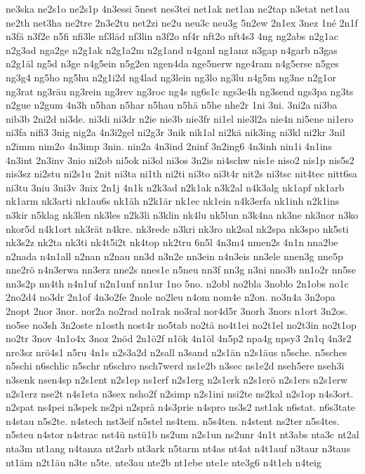 {ne3ska
ne2s1o
ne2s1p
4n3essi
5nest
nes3tei
net1ak
net1an
ne2tap
n3etat
net1au
ne2th
net3ha
ne2tre
2n3e2tu
net2zi
ne2u
neu3c
neu3g
5n2ew
2n1ex
3nez
1né
2n1f
n3fä
n3f2e
n5fi
nfi3le
nf3läd
nf3lin
n3f2o
nf4r
nft2o
nft4s3
4ng
ng2abs
n2g1ac
n2g3ad
nga2ge
n2g1ak
n2g1a2m
n2g1and
n4ganl
ng1anz
n3gap
n4garb
n3gas
n2g1äl
ng5d
n3ge
n4g5ein
n5g2en
ngen4da
nge5nerw
nge4ram
n4g5erse
n5ges
ng3g4
ng5ho
ng5hu
n2g1i2d
ng4lad
ng3lein
ng3lo
ng3lu
n4g5m
ng3ne
n2g1or
ng3rat
ng3räu
ng3rein
ng3rev
ng3roc
ng4s
ng6s1c
ngs3e4h
ng3send
ngs3pa
ng3ts
n2gue
n2gum
4n3h
n5han
n5har
n5hau
n5hä
n5he
nhe2r
1ni
3ni.
3ni2a
ni3ba
nib3b
2ni2d
ni3de.
ni3di
ni3dr
n2ie
nie3b
nie3fr
ni1el
nie3l2a
nie4n
ni5ene
ni1ero
ni3fa
nifi3
3nig
nig2a
4n3i2gel
ni2g3r
3nik
nik1al
ni2kä
nik3ing
ni3kl
ni2kr
3nil
n2imm
nim2o
4n3imp
3nin.
nin2a
4n3ind
2ninf
3n2ing6
4n3inh
nin1i
4n1ins
4n3int
2n3inv
3nio
ni2ob
ni5ok
ni3ol
ni3os
3n2is
ni4schw
nis1e
niso2
nis1p
nis5s2
nis3sz
ni2stu
ni2s1u
2nit
ni3ta
ni1th
ni2ti
ni3to
ni3t4r
nit2s
ni3tsc
nit4tec
nitt6sa
ni3tu
3niu
3ni3v
3nix
2n1j
4n1k
n2k3ad
n2k1ak
n3k2al
n4k3alg
nk1apf
nk1arb
nk1arm
nk3arti
nk1au6s
nk1äh
n2k1är
nk1ec
nk1ein
n4k3erfa
nk1inh
n2k1ins
n3kir
n5klag
nk3len
nk3les
n2k3li
n3klin
nk4lu
nk5lun
n3k4na
nk3ne
nk3nor
n3ko
nkor5d
n4k1ort
nk3rät
n4kre.
nk3rede
n3kri
nk3ro
nk2sal
nk2spa
nk3spo
nk5sti
nk3s2z
nk2ta
nk3ti
nk4t5i2t
nk4top
nk2tru
6n5l
4n3m4
nmen2s
4n1n
nna2be
n2nada
n4n1all
n2nan
n2nau
nn3d
n3n2e
nn3ein
n4n3eis
nn3ele
nnen3g
nne5p
nne2rö
n4n3erwa
nn3erz
nne2s
nnes1e
n5neu
nn3f
nn3g
n3ni
nno3b
nn1o2r
nn5se
nn3s2p
nn4th
n4n1uf
n2n1unf
nn1ur
1no
5no.
n2obl
no2bla
3noblo
2n1obs
no1c
2no2d4
no3dr
2n1of
4n3o2fe
2nole
no2leu
n4om
nom4e
n2on.
no3n4a
3n2opa
2nopt
2nor
3nor.
nor2a
no2rad
no1rak
no3ral
nor4d5r
3norh
3nors
n1ort
3n2os.
no5se
no3sh
3n2oste
n1osth
nost4r
no5tab
no2tä
no4t1ei
no2t1el
no2t3in
no2t1op
no2tr
3nov
4n1o4x
3noz
2nöd
2n1ö2f
n1ök
4n1öl
4n5p2
npa4g
npsy3
2n1q
4n3r2
nre3sz
nrö4s1
n5ru
4n1s
n2s3a2d
n2sall
n3sand
n2s1än
n2s1äus
n5sche.
n5sches
n5schi
n6schlic
n5schr
n6schro
nsch7werd
ns1e2b
n3sec
ns1e2d
nseh5ere
nseh3i
n3senk
nsen4sp
n2s1ent
n2s1ep
ns1erf
n2s1erg
n2s1erk
n2s1erö
n2s1ers
n2s1erw
n2s1erz
nse2t
n4s1eta
n3sex
nsho2f
n2simp
n2s1ini
nsi2te
ns2kal
n2s1op
n4s3ort.
n2spat
ns4pei
n3spek
ns2pi
n2sprä
n4s3prie
n4spro
ns3s2
nst1ak
n6stat.
n6s3tate
n4stau
n5s2te.
n4stech
nst3eif
n5stel
ns4tem.
n5s4ten.
n4stent
ns2ter
n5s4tes.
n5steu
n4stor
n4strac
nst4ü
nstü1b
ns2um
n2s1un
ns2unr
4n1t
nt3abs
nta3c
nt2al
nta3m
nt1ang
n4tanza
nt2arb
nt3ark
n5tarm
nt4as
nt4at
n4t1auf
n3taur
n3taus
nt1äm
n2t1äu
n3te
n5te.
nte3au
nte2b
nt1ebe
nte1e
nte3g6
n4t1eh
n4teig
}
